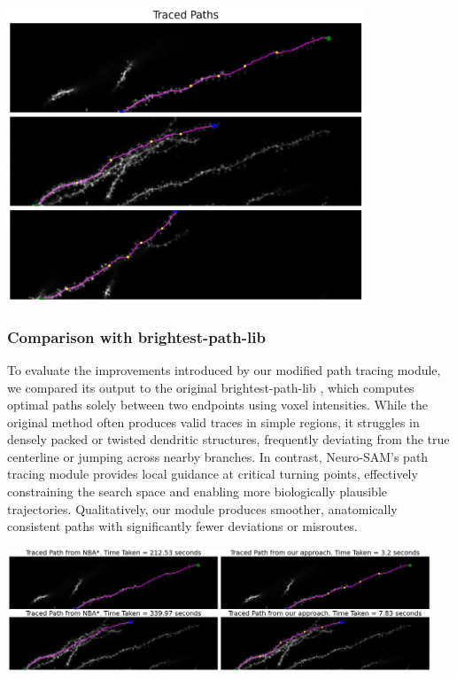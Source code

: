 \begin{center}
\includegraphics[width=0.8\textwidth]{figures/31_path_waypoints.png}
\label{fig:path_waypoints}
\end{center}

\subsubsection{\textbf{Comparison with brightest-path-lib}}
To evaluate the improvements introduced by our modified path tracing module, we compared its output to the original brightest-path-lib \cite{Jha_2023}, which computes optimal paths solely between two endpoints using voxel intensities. While the original method often produces valid traces in simple regions, it struggles in densely packed or twisted dendritic structures, frequently deviating from the true centerline or jumping across nearby branches. In contrast, Neuro-\gls{SAM}'s path tracing module provides local guidance at critical turning points, effectively constraining the search space and enabling more biologically plausible trajectories. Qualitatively, our module produces smoother, anatomically consistent paths with significantly fewer deviations or misroutes.

\begin{center}
\includegraphics[width=0.95\textwidth]{figures/32_path_comparison.png}
\label{fig:path_comparison}
\end{center}

